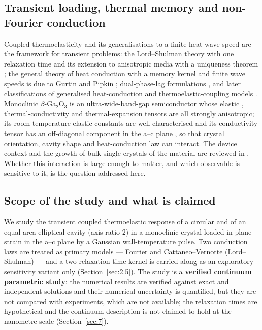 \documentclass[preprint,12pt]{elsarticle}
\begin{document}
\subsection{Transient loading, thermal memory and non-Fourier conduction}
\label{sec:1.2}

Coupled thermoelasticity \cite{biot1956} and its generalisations to a finite heat-wave speed are the framework for transient problems: the Lord--Shulman theory with one relaxation time \cite{lord1967} and its extension to anisotropic media with a uniqueness theorem \cite{dhaliwal1980}; the general theory of heat conduction with a memory kernel and finite wave speeds is due to Gurtin and Pipkin \cite{gurtin1968}; dual-phase-lag formulations \cite{tzou1995}, and later classifications of generalised heat-conduction and thermoelastic-coupling models \cite{chandra1998,huang2025}. Monoclinic $\beta$-Ga$_2$O$_3$ is an ultra-wide-band-gap semiconductor whose elastic \cite{adachi2018}, thermal-conductivity \cite{klimm2023} and thermal-expansion \cite{orlandi2015,cheng2018} tensors are all strongly anisotropic; its room-temperature elastic constants are well characterised \cite{adachi2018} and its conductivity tensor has an off-diagonal component in the a--c plane \cite{klimm2023}, so that crystal orientation, cavity shape and heat-conduction law can interact. The device context and the growth of bulk single crystals of the material are reviewed in \cite{pearton2018,galazka2022}. Whether this interaction is large enough to matter, and which observable is sensitive to it, is the question addressed here.

\subsection{Scope of the study and what is claimed}
\label{sec:1.3}

We study the transient coupled thermoelastic response of a circular and of an equal-area elliptical cavity (axis ratio 2) in a monoclinic crystal loaded in plane strain in the a--c plane by a Gaussian wall-temperature pulse. Two conduction laws are treated as primary models --- Fourier and Cattaneo--Vernotte (Lord--Shulman) --- and a two-relaxation-time kernel is carried along as an exploratory sensitivity variant only (Section~\ref{sec:2.5}). The study is a \textbf{verified continuum parametric study}: the numerical results are verified against exact and independent solutions and their numerical uncertainty is quantified, but they are not compared with experiments, which are not available; the relaxation times are hypothetical and the continuum description is not claimed to hold at the nanometre scale (Section~\ref{sec:7}).
\end{document}
